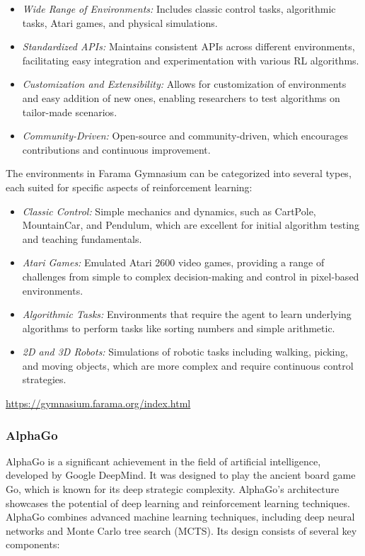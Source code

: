 \begin{itemize}
\item \emph{Wide Range of Environments:} Includes classic control tasks, algorithmic tasks, Atari games, and physical simulations.
\item \emph{Standardized APIs:} Maintains consistent APIs across different environments, facilitating easy integration and experimentation with various RL algorithms.
\item \emph{Customization and Extensibility:} Allows for customization of environments and easy addition of new ones, enabling researchers to test algorithms on tailor-made scenarios.
\item \emph{Community-Driven:} Open-source and community-driven, which encourages contributions and continuous improvement.
\end{itemize}

The environments in Farama Gymnasium can be categorized into several types, each suited for specific aspects of reinforcement learning:

\begin{itemize}
\item \emph{Classic Control:} Simple mechanics and dynamics, such as CartPole, MountainCar, and Pendulum, which are excellent for initial algorithm testing and teaching fundamentals.
\item \emph{Atari Games:} Emulated Atari 2600 video games, providing a range of challenges from simple to complex decision-making and control in pixel-based environments.
\item \emph{Algorithmic Tasks:} Environments that require the agent to learn underlying algorithms to perform tasks like sorting numbers and simple arithmetic.
\item \emph{2D and 3D Robots:} Simulations of robotic tasks including walking, picking, and moving objects, which are more complex and require continuous control strategies.
\end{itemize}

\begin{tcolorbox}[colback=code]
\small
\url{https://gymnasium.farama.org/index.html}
\normalsize
\end{tcolorbox}

\subsubsection*{AlphaGo}

AlphaGo is a significant achievement in the field of artificial intelligence, developed by Google DeepMind. It was designed to play the ancient board game Go, which is known for its deep strategic complexity.  AlphaGo's architecture showcases the potential of deep learning and reinforcement learning techniques. AlphaGo combines advanced machine learning techniques, including deep neural networks and Monte Carlo tree search (MCTS). Its design consists of several key components:

